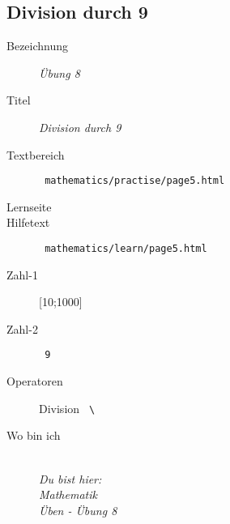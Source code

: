 \subsection{ Division durch 9 }
\label{cha:math-practise-page8}
\begin{description}
  \item[Bezeichnung] \emph{ Übung 8 }
  \item[Titel] \emph{ Division durch 9 }
  \item[Textbereich] \texttt{ mathematics/practise/page5.html }
  \item[Lernseite] 
  \item[Hilfetext] \texttt{ mathematics/learn/page5.html }
  \item[Zahl-1] [10;1000]
  \item[Zahl-2] \texttt{ 9 }
  \item[Operatoren] Division \texttt{ \textbackslash }
  \item[Wo bin ich] \emph{\\Du bist hier:\\Mathematik\\Üben - Übung 8}
\end{description}
